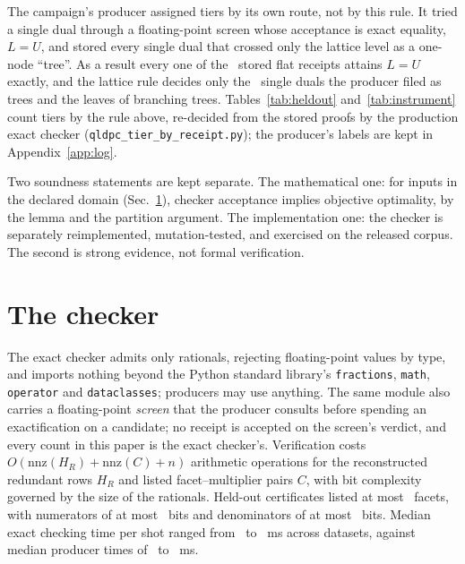 \documentclass[aps,pra,twocolumn,superscriptaddress,nofootinbib,longbibliography,floatfix]{revtex4-2}
\begin{document}
The campaign's producer assigned tiers by its own route, not by this rule. It tried a single dual through a floating-point screen whose acceptance is exact equality, $L=U$, and stored every single dual that crossed only the lattice level as a one-node ``tree''. As a result every one of the \RtHoSingleAttaining\ stored flat receipts attains $L=U$ exactly, and the lattice rule decides only the \RtHoSingleLattice\ single duals the producer filed as trees and the leaves of branching trees. Tables~\ref{tab:heldout} and~\ref{tab:instrument} count tiers by the rule above, re-decided from the stored proofs by the production exact checker (\texttt{qldpc\_tier\_by\_receipt.py}); the producer's labels are kept in Appendix~\ref{app:log}.

Two soundness statements are kept separate. The mathematical one: for inputs in the declared domain (Sec.~\ref{sec:checker}), checker acceptance implies objective optimality, by the lemma and the partition argument. The implementation one: the checker is separately reimplemented, mutation-tested, and exercised on the released corpus. The second is strong evidence, not formal verification.

\section{The checker}
\label{sec:checker}

The exact checker admits only rationals, rejecting floating-point values by type, and imports nothing beyond the Python standard library's \texttt{fractions}, \texttt{math}, \texttt{operator} and \texttt{dataclasses}; producers may use anything. The same module also carries a floating-point \emph{screen} that the producer consults before spending an exactification on a candidate; no receipt is accepted on the screen's verdict, and every count in this paper is the exact checker's. Verification costs $O(\mathrm{nnz}(H_R)+\mathrm{nnz}(C)+n)$ arithmetic operations for the reconstructed redundant rows $H_R$ and listed facet--multiplier pairs $C$, with bit complexity governed by the size of the rationals. Held-out certificates listed at most \HoMaxFacets\ facets, with numerators of at most \HoMaxNumBits\ bits and denominators of at most \HoMaxDenBits\ bits. Median exact checking time per shot ranged from \TimeExactCheckMedLo\ to \TimeExactCheckMedHi\ ms across datasets, against median producer times of \TimeLpMedLo\ to \TimeLpMedHi\ ms.
\end{document}
